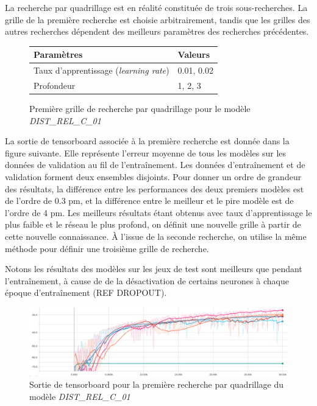 \par La recherche par quadrillage est en réalité constituée de trois sous-recherches. La grille de la première recherche est choisie arbitrairement, tandis que les grilles des autres recherches dépendent des meilleurs paramètres des recherches précédentes.

\begin{figure}[!h]
	\centering
	
	\begin{tabular}{|l|l|}
		\hline
		\textbf{Paramètres} & \textbf{Valeurs} \\ \hline 
		Taux d'apprentissage (\emph{learning rate}) & 0.01, 0.02 \\ \hline
		Profondeur & 1, 2, 3 \\ \hline
	\end{tabular}		
	
	\caption{Première grille de recherche par quadrillage pour le modèle \emph{DIST\_REL\_C\_01}}
\end{figure}

\par La sortie de tensorboard associée à la première recherche est donnée dans la figure suivante. Elle représente l'erreur moyenne de tous les modèles sur les données de validation au fil de l'entraînement. Les données d'entraînement et de validation forment deux ensembles disjoints. Pour donner un ordre de grandeur des résultats, la différence entre les performances des deux premiers modèles est de l'ordre de 0.3 pm, et la différence entre le meilleur et le pire modèle est de l'ordre de 4 pm. Les meilleurs résultats étant obtenus avec taux d'apprentissage le plus faible et le réseau le plus profond, on définit une nouvelle grille à partir de cette nouvelle connaissance. À l'issue de la seconde recherche, on utilise la même méthode pour définir une troisième grille de recherche.
\par Notons les résultats des modèles sur les jeux de test sont meilleurs que pendant l'entraînement, à cause de de la désactivation de certains neurones à chaque époque d'entraînement (REF DROPOUT).

\vspace{0.5cm}

\begin{figure}[!h]
	\centering
	\includegraphics[scale=0.35]{images/tboard.png}
	\caption{Sortie de tensorboard pour la première recherche par quadrillage du modèle \emph{DIST\_REL\_C\_01}}
\end{figure}

